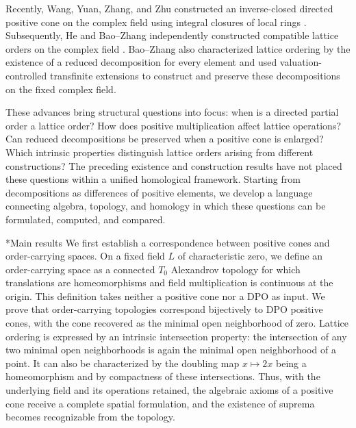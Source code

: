 \documentclass[10pt,letterpaper]{amsart}
\makeatletter
\numberwithin{equation}{section}
\theoremstyle{definition}
\def\subsection{\@startsection{subsection}{2}
  \z@{.9\linespacing\@plus.3\linespacing}{.4\linespacing}
  {\normalfont\fontsize{11.5}{14}\selectfont\bfseries\boldmath\raggedright}}
\makeatother
\begin{document}
Recently, Wang, Yuan, Zhang, and Zhu constructed an inverse-closed directed positive cone on the complex field using integral closures of local rings \cite{WYZZ}. Subsequently, He and Bao--Zhang independently constructed compatible lattice orders on the complex field \cite{He,BY}. Bao--Zhang also characterized lattice ordering by the existence of a reduced decomposition for every element and used valuation-controlled transfinite extensions to construct and preserve these decompositions on the fixed complex field.

These advances bring structural questions into focus: when is a directed partial order a lattice order? How does positive multiplication affect lattice operations? Can reduced decompositions be preserved when a positive cone is enlarged? Which intrinsic properties distinguish lattice orders arising from different constructions? The preceding existence and construction results have not placed these questions within a unified homological framework. Starting from decompositions as differences of positive elements, we develop a language connecting algebra, topology, and homology in which these questions can be formulated, computed, and compared.

\subsection*{Main results}
We first establish a correspondence between positive cones and order-carrying spaces. On a fixed field $L$ of characteristic zero, we define an order-carrying space as a connected $T_0$ Alexandrov topology for which translations are homeomorphisms and field multiplication is continuous at the origin. This definition takes neither a positive cone nor a DPO as input. We prove that order-carrying topologies correspond bijectively to DPO positive cones, with the cone recovered as the minimal open neighborhood of zero. Lattice ordering is expressed by an intrinsic intersection property: the intersection of any two minimal open neighborhoods is again the minimal open neighborhood of a point. It can also be characterized by the doubling map $x\mapsto2x$ being a homeomorphism and by compactness of these intersections. Thus, with the underlying field and its operations retained, the algebraic axioms of a positive cone receive a complete spatial formulation, and the existence of suprema becomes recognizable from the topology.
\end{document}

